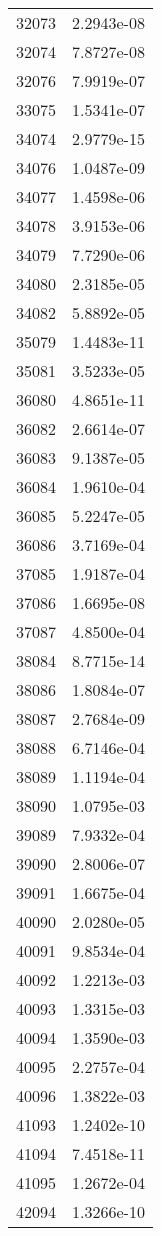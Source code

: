 \begin{table}[h!]
\begin{tabular}{|| c || c |}
32073 & 2.2943e-08 \\
32074 & 7.8727e-08 \\
32076 & 7.9919e-07 \\
33075 & 1.5341e-07 \\
34074 & 2.9779e-15 \\
34076 & 1.0487e-09 \\
34077 & 1.4598e-06 \\
34078 & 3.9153e-06 \\
34079 & 7.7290e-06 \\
34080 & 2.3185e-05 \\
34082 & 5.8892e-05 \\
35079 & 1.4483e-11 \\
35081 & 3.5233e-05 \\
36080 & 4.8651e-11 \\
36082 & 2.6614e-07 \\
36083 & 9.1387e-05 \\
36084 & 1.9610e-04 \\
36085 & 5.2247e-05 \\
36086 & 3.7169e-04 \\
37085 & 1.9187e-04 \\
37086 & 1.6695e-08 \\
37087 & 4.8500e-04 \\
38084 & 8.7715e-14 \\
38086 & 1.8084e-07 \\
38087 & 2.7684e-09 \\
38088 & 6.7146e-04 \\
38089 & 1.1194e-04 \\
38090 & 1.0795e-03 \\
39089 & 7.9332e-04 \\
39090 & 2.8006e-07 \\
39091 & 1.6675e-04 \\
40090 & 2.0280e-05 \\
40091 & 9.8534e-04 \\
40092 & 1.2213e-03 \\
40093 & 1.3315e-03 \\
40094 & 1.3590e-03 \\
40095 & 2.2757e-04 \\
40096 & 1.3822e-03 \\
41093 & 1.2402e-10 \\
41094 & 7.4518e-11 \\
41095 & 1.2672e-04 \\
42094 & 1.3266e-10 \\

\end{tabular}
\end{table}
